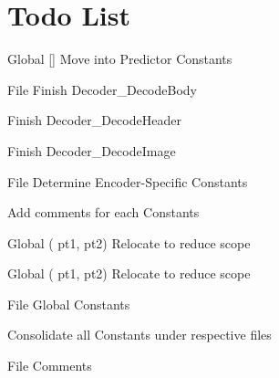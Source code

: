\chapter{Todo List}
\hypertarget{todo}{}\label{todo}

\begin{DoxyRefList}
\item[Global \doxylink{sample__representative_8h_aa25f2ddef46c2c5466643b137580700a}{damping} \mbox{[}\mbox{]}]\label{todo__todo000024}%
%
Move into Predictor Constants  
\item[File \doxylink{decoder_8h}{decoder.h} ]\label{todo__todo000009}%
%
Finish Decoder\+\_\+\+Decode\+Body 



Finish Decoder\+\_\+\+Decode\+Header 



Finish Decoder\+\_\+\+Decode\+Image  
\item[File \doxylink{encoder__constants_8h}{encoder\+\_\+constants.h} ]\label{todo__todo000001}%
%
Determine Encoder-\/\+Specific Constants 



Add comments for each Constants 
\item[Global \doxylink{math__functions_8h_a61e36d5241561d1bc112c291a3262565}{Euclidian2} (\doxylink{structdim2}{dim2} pt1, \doxylink{structdim2}{dim2} pt2)]\label{todo__todo000017}%
%
Relocate to reduce scope  
\item[Global \doxylink{math__functions_8h_adfddd321b4840c92df9f1d48e11c657e}{Euclidian3} (\doxylink{structdim3}{dim3} pt1, \doxylink{structdim3}{dim3} pt2)]\label{todo__todo000018}%
%
Relocate to reduce scope  
\item[File \doxylink{global__constants_8h}{global\+\_\+constants.h} ]\label{todo__todo000002}%
%
Global Constants 



Consolidate all Constants under respective files  
\item[File \doxylink{hash__table_8h}{hash\+\_\+table.h} ]\label{todo__todo000010}%
%
Comments 




\end{DoxyRefList}
